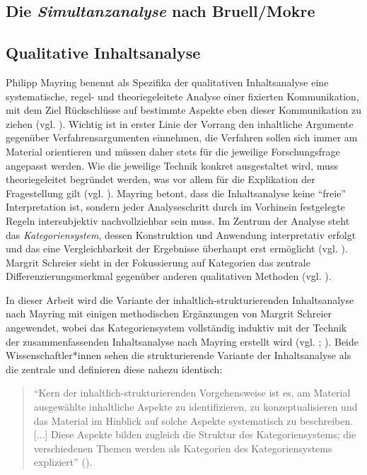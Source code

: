 \documentclass[12pt, titlepage=true, toc=bib]{scrartcl}
\begin{document}
\subsection{Die \textit{Simultanzanalyse} nach Bruell/Mokre}



\subsection{Qualitative Inhaltsanalyse}

Philipp Mayring benennt als Spezifika der qualitativen Inhaltsanalyse eine systematische, regel- und theoriegeleitete Analyse einer fixierten Kommunikation, mit dem Ziel Rückschlüsse auf bestimmte Aspekte eben dieser Kommunikation zu ziehen (vgl. \cite[13]{mayring_qualitative_2010}). Wichtig ist in erster Linie der Vorrang den inhaltliche Argumente gegenüber Verfahrensargumenten einnehmen, die Verfahren sollen sich immer am Material orientieren und müssen daher stets für die jeweilige Forschungsfrage angepasst werden. Wie die jeweilige Technik konkret ausgestaltet wird, muss theoriegeleitet begründet werden, was vor allem für die Explikation der Fragestellung gilt (vgl. \cite[50-51]{mayring_qualitative_2010}). Mayring betont, dass die Inhaltsanalyse keine "`freie"' Interpretation ist, sondern jeder Analyseschritt durch im Vorhinein festgelegte Regeln intersubjektiv nachvollziehbar sein muss. Im Zentrum der Analyse steht das \textit{Kategoriensystem}, dessen Konstruktion und Anwendung interpretativ erfolgt und das eine Vergleichbarkeit der Ergebnisse überhaupt erst ermöglicht (vgl. \cite[49]{mayring_qualitative_2010}). Margrit Schreier sieht in der Fokussierung auf Kategorien das zentrale Differenzierungsmerkmal gegenüber anderen qualitativen Methoden (vgl. \cite[3]{schreier_varianten_2014}).

In dieser Arbeit wird die Variante der inhaltlich-strukturierenden Inhaltsanalyse nach Mayring mit einigen methodischen Ergänzungen von Margrit Schreier angewendet, wobei das Kategoriensystem vollständig induktiv mit der Technik der zusammenfassenden Inhaltsanalyse nach Mayring erstellt wird (vgl. \cite{mayring_qualitative_2010}; \cite{schreier_varianten_2014}). Beide Wissenschaftler*innen sehen die strukturierende Variante der Inhaltsanalyse als die zentrale und definieren diese nahezu identisch:

\begin{singlespace*}
\begin{quote}
"`Kern der inhaltlich-strukturierenden Vorgehensweise ist es, am Material ausgewählte inhaltliche Aspekte zu identifizieren, zu konzeptualisieren und das Material im Hinblick auf solche Aspekte systematisch zu beschreiben. [...] Diese Aspekte bilden zugleich die Struktur des Kategoriensystems; die verschiedenen Themen werden als Kategorien des Kategoriensystems expliziert"' (\cite[5]{schreier_varianten_2014}).
\end{quote}
\end{singlespace*}
\end{document}
